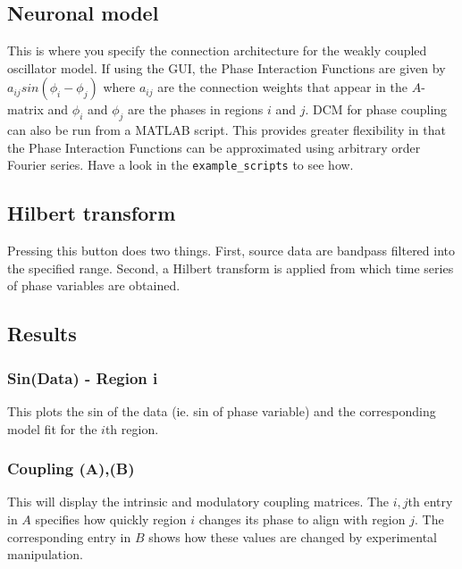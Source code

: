 \subsection{Neuronal model}
This is where you specify the connection architecture for the weakly coupled oscillator model. If using the GUI, the Phase Interaction Functions are given by $a_{ij} sin (\phi_i-\phi_j)$ where $a_{ij}$ are the connection weights that appear in the $A$-matrix and $\phi_i$ and $\phi_j$ are the phases in regions $i$ and $j$. DCM for phase coupling can also be run from a MATLAB script. This provides greater flexibility in that the Phase Interaction Functions can be approximated using arbitrary order Fourier series. Have a look in the \texttt{example\_scripts} to see how.

\subsection{Hilbert transform}
Pressing this button does two things. First, source data are bandpass filtered into the specified range. Second, a Hilbert transform is applied from which time series of phase variables are obtained. 

\subsection{Results}

\subsubsection{Sin(Data) - Region i}
This plots the sin of the data (ie. sin of phase variable) and the corresponding model fit for the $i$th region.

\subsubsection{Coupling (A),(B)}
This will display the intrinsic and modulatory coupling matrices. The $i,j$th entry in $A$ specifies how quickly region $i$ changes its phase to align with region $j$. The corresponding entry in $B$ shows how these values are changed by experimental manipulation. 
